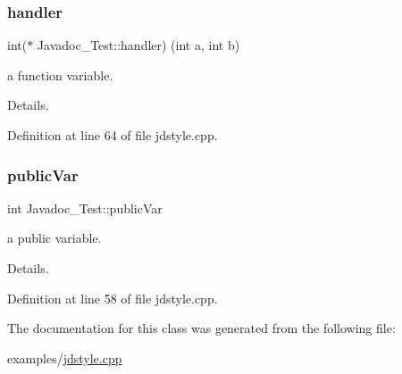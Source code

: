\subsubsection{\texorpdfstring{handler}{handler}}
{\footnotesize\ttfamily int($\ast$ Javadoc\+\_\+\+Test\+::handler) (int a, int b)}



a function variable. 

Details. 

Definition at line 64 of file jdstyle.\+cpp.

\mbox{\label{class_javadoc___test_a44a516fbc3a4865e2dcae34649c9df6a}} 
\subsubsection{\texorpdfstring{publicVar}{publicVar}}
{\footnotesize\ttfamily int Javadoc\+\_\+\+Test\+::public\+Var}



a public variable. 

Details. 

Definition at line 58 of file jdstyle.\+cpp.



The documentation for this class was generated from the following file\+:\begin{DoxyCompactItemize}
\item 
examples/\mbox{\hyperlink{jdstyle_8cpp}{jdstyle.\+cpp}}\end{DoxyCompactItemize}

